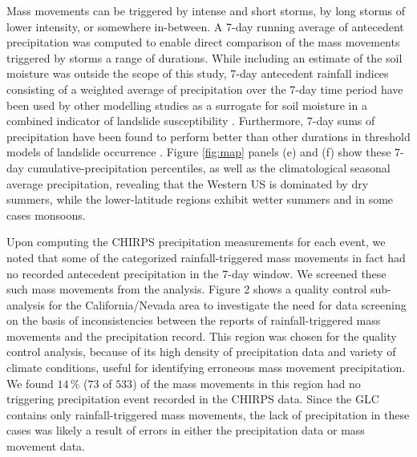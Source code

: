 \documentclass[nhess, manuscript]{copernicus}
\begin{document}
Mass movements can be triggered by intense and short storms, by long storms of 
lower intensity, or somewhere in-between. A 7-day running average of antecedent 
precipitation was computed to enable direct comparison of the mass movements 
triggered by storms a range of durations. While including an estimate of the 
soil moisture was outside the 
scope of this study, 7-day antecedent rainfall indices consisting of a weighted 
average of precipitation over the 7-day time period have been used by other 
modelling studies as a surrogate for soil moisture in a combined indicator of 
landslide susceptibility  
\citep{jamesAntecedentMoistureConditions2009, kirschbaumSatelliteBasedAssessmentRainfallTriggered2018}. 
Furthermore, 7-day sums of precipitation have been found to perform better 
than other durations in threshold models of landslide occurrence 
\citep{krkavc2017method, garcia2015rainfall}.
Figure \ref{fig:map} panels (e) and (f) show these 7-day cumulative-precipitation 
percentiles, as well as the climatological seasonal average precipitation, revealing 
that the Western US is dominated by dry summers, while the lower-latitude regions 
exhibit wetter summers and in some cases monsoons.

Upon computing the CHIRPS precipitation measurements for each event, we noted 
that some of the categorized rainfall-triggered mass movements in fact had no recorded antecedent 
precipitation in the 7-day window. We screened these such mass movements from the analysis. 
Figure 2 shows a quality control 
sub-analysis for the California/Nevada area to investigate the need for data 
screening on the basis of inconsistencies between the reports of rainfall-triggered 
mass movements and the precipitation 
record. This region was chosen for the quality control analysis, because of its 
high density of precipitation data and variety of climate conditions, useful for 
identifying erroneous mass movement precipitation. We found \(14\,\%\) (\(73\) of \(533\)) 
of the mass movements in this region had no triggering precipitation event recorded in 
the CHIRPS data. Since the GLC contains only rainfall-triggered mass movements, the lack 
of precipitation in these cases was likely a result of errors in either the precipitation 
data or mass movement data. 
\end{document}

